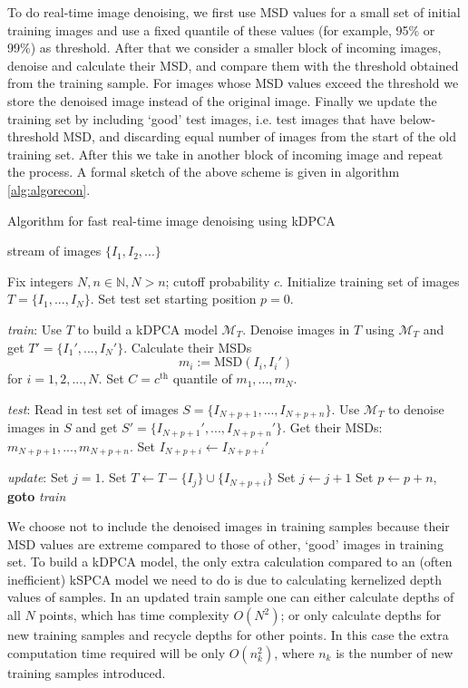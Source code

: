 \documentclass[10pt, conference, compsocconf]{IEEEtran}
\begin{document}
To do real-time image denoising, we first use MSD values for a small set of initial training images and use a fixed quantile of these values (for example, 95\% or 99\%) as threshold. After that we consider a smaller block of incoming images, denoise and calculate their MSD, and compare them with the threshold obtained from the training sample. For images whose MSD values exceed the threshold we store the denoised image instead of the original image. Finally we update the training set by including `good' test images, i.e. test images that have below-threshold MSD, and discarding equal number of images from the start of the old training set. After this we take in another block of incoming image and repeat the process. A formal sketch of the above scheme is given in algorithm \ref{alg:algorecon}.

\begin{algorithm}
\caption{Algorithm for fast real-time image denoising using kDPCA}
\label{alg:algorecon}
\begin{algorithmic}[1]
 {stream of images $\{I_1,I_2,...\}$}

\State Fix integers $N,n \in \mathbb{N}, N>n$; cutoff probability $c$.
\State Initialize training set of images $T = \{ I_1, ..., I_N\}$.
\State Set test set starting position $p=0$.

\State \emph{train}:
\State Use $T$ to build a kDPCA model $\mathcal{M}_T$.
\State Denoise images in $T$ using $\mathcal{M}_T$ and get $T' = \{ I_1', ..., I_N'\}$.
\State Calculate their MSDs
$$m_i := \text{MSD}(I_i, I_i')$$
for $i = 1,2,...,N$.
\State Set $C = c^\text{th}$ quantile of $m_1,...,m_N$.

\State \emph{test}:
\State Read in test set of images $S = \{I_{N+p+1}, ... ,I_{N+p+n}\}$.
\State Use $\mathcal{M}_T$ to denoise images in $S$ and get $S' = \{I_{N+p+1}', ... ,I_{N+p+n}'\}$.
\State Get their MSDs: $m_{N+p+1},...,m_{N+p+n}$.
\State Set $I_{N+p+i} \leftarrow I_{N+p+i}'$
\EndIf
\EndFor

\State \emph{update}:
\State Set $j=1$.
\State Set $T \leftarrow T - \{I_j\} \cup \{I_{N+p+i}\}$
\State Set $j \leftarrow j+1$
\EndIf
\EndFor
\State Set $p \leftarrow p+n$, \textbf{goto} \emph{train}

\EndProcedure
\end{algorithmic}
\end{algorithm}

We choose not to include the denoised images in training samples because their MSD values are extreme compared to those of other, `good' images in training set. To build a kDPCA model, the only extra calculation compared to an (often inefficient) kSPCA model we need to do is due to calculating kernelized depth values of samples. In an updated train sample one can either calculate depths of all $N$ points, which has time complexity $O(N^2)$; or only calculate depths for new training samples and recycle depths for other points. In this case the extra computation time required will be only $O(n_k^2)$, where $n_k$ is the number of new training samples introduced.
\end{document}
